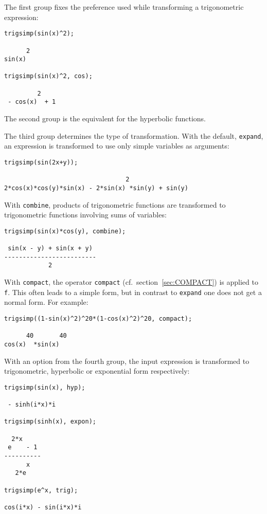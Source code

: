The first group fixes the preference used while transforming a
trigonometric expression:
\begin{verbatim}
trigsimp(sin(x)^2);

      2
sin(x)

trigsimp(sin(x)^2, cos);

         2
 - cos(x)  + 1
\end{verbatim}
The second group is the equivalent for the hyperbolic functions.

The third group determines the type of transformation.  With the
default, \texttt{expand}, an expression is transformed to use only
simple variables as arguments:
\begin{verbatim}
trigsimp(sin(2x+y));

                                 2
2*cos(x)*cos(y)*sin(x) - 2*sin(x) *sin(y) + sin(y)
\end{verbatim}
With \texttt{combine}, products of trigonometric functions are
transformed to trig\-onometric functions involving sums of variables:
\begin{verbatim}
trigsimp(sin(x)*cos(y), combine);

 sin(x - y) + sin(x + y)
-------------------------
            2
\end{verbatim}
With \texttt{compact}, the \REDUCE{} operator \texttt{compact} (cf.~section~\ref{sec:COMPACT})
is applied to \texttt{f}.  This often leads to a simple
form, but in contrast to \texttt{expand} one does not get a normal
form. For example:
\begin{verbatim}
trigsimp((1-sin(x)^2)^20*(1-cos(x)^2)^20, compact);

      40       40
cos(x)  *sin(x)
\end{verbatim}

With an option from the fourth group, the input expression is
transformed to trigonometric, hyperbolic or exponential form
respectively:
\begin{verbatim}
trigsimp(sin(x), hyp);

 - sinh(i*x)*i

trigsimp(sinh(x), expon);

  2*x
 e    - 1
----------
      x
   2*e

trigsimp(e^x, trig);

cos(i*x) - sin(i*x)*i
\end{verbatim}

